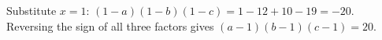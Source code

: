 Substitute $ x=1 $: $(1-a)(1-b)(1-c)=1-12+10-19=-20 $. Reversing the sign of all three factors gives $\boxed{(a-1)(b-1)(c-1)=20}$.

